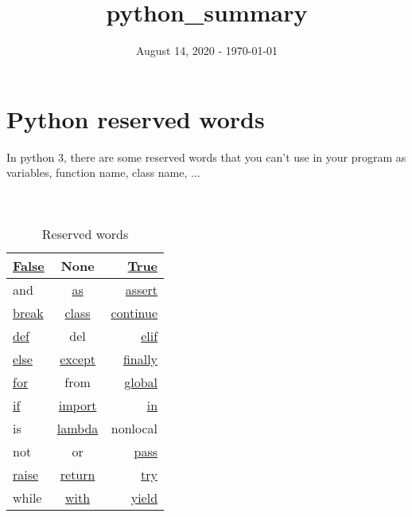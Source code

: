 \documentclass[a4paper, 12pt, titlepage]{scrartcl} %
\title{python\_summary}
\author{}
\date{August 14, 2020 - \today}
\begin{document}
\maketitle
\newpage

\tableofcontents

\newpage
\section{Python reserved words}
In python 3, there are some reserved words that you can't use in your program as variables, function name, class name, ... \\ \\ \\

\begin{table}[h]
\begin{center}
{\renewcommand{\arraystretch}{2} %
{\setlength{\tabcolsep}{1.5cm} %
\begin{tabular}{|l|c|r|}
  \hline
  \hyperref[subsec:Bool]{False} & None & \hyperref[subsec:Bool]{True} \\
  \hline
  and & \hyperref[As]{as} & \hyperref[subsec:Assertion]{assert} \\
  \hline
  \hyperref[subsec:BCPR]{break} & \hyperref[sec:Class]{class} & \hyperref[subsec:BCPR]{continue} \\
  \hline
  \hyperref[sec:Function]{def} & del & \hyperref[IEE]{elif} \\
  \hline
  \hyperref[IEE]{else} & \hyperref[TEEF]{except} & \hyperref[TEEF]{finally} \\
  \hline
  \hyperref[subsec:For]{for} & from & \hyperref[subsec:Global]{global} \\
  \hline
  \hyperref[IEE]{if} & \hyperref[subsec:Import]{import} & \hyperref[Comprehension]{in} \\
  \hline
  is & \hyperref[subsec:Lambda]{lambda} & nonlocal \\
  \hline 
  not & or & \hyperref[subsec:BCPR]{pass} \\
  \hline 
  \hyperref[Raise]{raise} & \hyperref[subsec:BCPR]{return} & \hyperref[TEEF]{try} \\
  \hline
  while & \hyperref[subsec:ContextManager]{with} & \hyperref[sec:Generators]{yield} \\
  \hline
\end{tabular}}}
\end{center}
\caption{Reserved words}
\end{table}
\end{document}
